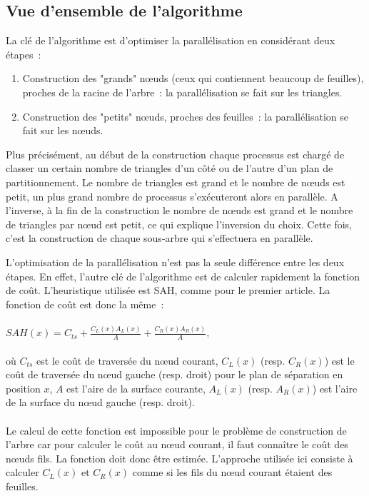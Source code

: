 \documentclass[a4paper]{article}
\begin{document}
\subsection{Vue d'ensemble de l'algorithme}

La clé de l'algorithme est d'optimiser la parallélisation en considérant deux étapes~:
\begin{enumerate}
	\item Construction des "grands" nœuds (ceux qui contiennent beaucoup de feuilles), proches de la racine de l'arbre~: la parallélisation se fait sur les triangles.
	\item Construction des "petits" nœuds, proches des feuilles~: la parallélisation se fait sur les nœuds.
\end{enumerate}
Plus précisément, au début de la construction chaque processus est chargé de classer un certain nombre de triangles d'un côté ou de l'autre d'un plan de partitionnement. Le nombre de triangles est grand et le nombre de nœuds est petit, un plus grand nombre de processus s’exécuteront alors en parallèle. A l'inverse, à la fin de la construction le nombre de nœuds est grand et le nombre de triangles par nœud est petit, ce qui explique l'inversion du choix. Cette fois, c'est la construction de chaque sous-arbre qui s'effectuera en parallèle.

L'optimisation de la parallélisation n'est pas la seule différence entre les deux étapes. En effet, l'autre clé de l'algorithme est de calculer rapidement la fonction de coût. L'heuristique utilisée est SAH, comme pour le premier article. La fonction de coût est donc la même~:
\\\\
$SAH(x) = C_{ts} + \frac{C_L(x)A_L(x)}{A} + \frac{C_R(x)A_R(x)}{A}$,
\\\\
où $C_{ts}$ est le coût de traversée du nœud courant, $C_L(x)$ (resp. $C_R(x)$) est le coût de traversée du nœud gauche (resp. droit) pour le plan de séparation en position $x$, $A$ est l'aire de la surface courante, $A_L(x)$ (resp. $A_R(x)$) est l'aire de la surface du nœud gauche (resp. droit).
\\\\
Le calcul de cette fonction est impossible pour le problème de construction de l'arbre car pour calculer le coût au nœud courant, il faut connaître le coût des nœuds fils. La fonction doit donc être estimée. L'approche utilisée ici consiste à calculer $C_L(x)$ et $C_R(x)$ comme si les fils du nœud courant étaient des feuilles.
\end{document}
